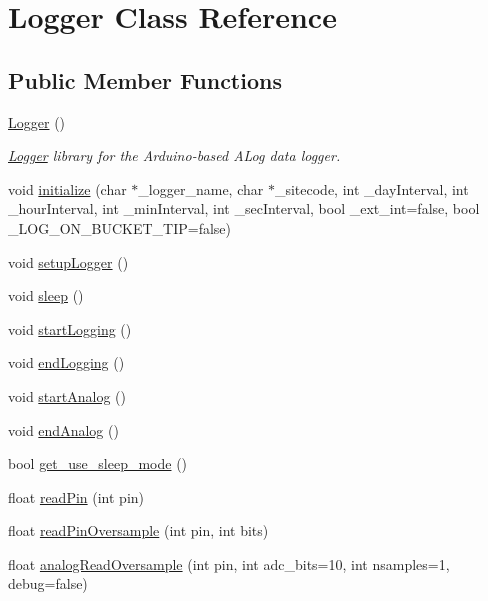 \hypertarget{classLogger}{}\section{Logger Class Reference}
\label{classLogger}
\subsection*{Public Member Functions}
\begin{DoxyCompactItemize}
\item 
\hyperlink{classLogger_abc41bfb031d896170c7675fa96a6b30c}{Logger} ()
\begin{DoxyCompactList}\small\item\em \hyperlink{classLogger}{Logger} library for the Arduino-\/based A\+Log data logger. \end{DoxyCompactList}\item 
void \hyperlink{classLogger_a9495e2c8e63850f3c7cfcc31e9d73ffe}{initialize} (char $\ast$\+\_\+logger\+\_\+name, char $\ast$\+\_\+sitecode, int \+\_\+day\+Interval, int \+\_\+hour\+Interval, int \+\_\+min\+Interval, int \+\_\+sec\+Interval, bool \+\_\+ext\+\_\+int=false, bool \+\_\+\+L\+O\+G\+\_\+\+O\+N\+\_\+\+B\+U\+C\+K\+E\+T\+\_\+\+T\+IP=false)
\item 
void \hyperlink{classLogger_ab5e0bd543758c65a17b77553a0e9f0c9}{setup\+Logger} ()
\item 
void \hyperlink{classLogger_ad90ff8f29410f6b70cc6334391400a4e}{sleep} ()
\item 
void \hyperlink{classLogger_a4a6c78dd1715b33ae4bbd6f66f116f77}{start\+Logging} ()
\item 
void \hyperlink{classLogger_aa82814d61687debcf3b8dd6f46c9d549}{end\+Logging} ()
\item 
void \hyperlink{classLogger_af936c7f58e23316abb5614cbd31c7ced}{start\+Analog} ()
\item 
void \hyperlink{classLogger_adca7be8a63592263c67f63766680d16f}{end\+Analog} ()
\item 
bool \hyperlink{classLogger_acc758b6fdaac8099c492929aa7f1691d}{get\+\_\+use\+\_\+sleep\+\_\+mode} ()
\item 
float \hyperlink{classLogger_a343fcabefb37e06429865a2e6a6e708a}{read\+Pin} (int pin)
\item 
float \hyperlink{classLogger_a4e67526c65fa865f276a515a200af4aa}{read\+Pin\+Oversample} (int pin, int bits)
\item 
float \hyperlink{classLogger_a73193a90982ddcb31ad0b401ec0e71fa}{analog\+Read\+Oversample} (int pin, int adc\+\_\+bits=10, int nsamples=1, debug=false)

\end{DoxyCompactItemize}
